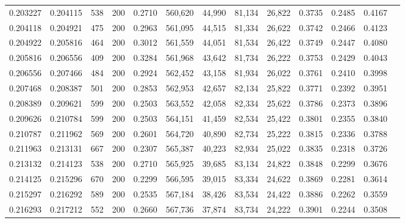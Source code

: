 \begin{tabular}{rrrrrrrrrrrrr}
0.203227 & 0.204115 &    538 & 200 &                                     0.2710 & 560,620 &  44,990 &  81,134 &  26,822 & 0.3735 & 0.2485 & 0.4167 \\
0.204118 & 0.204921 &    475 & 200 &                                     0.2963 & 561,095 &  44,515 &  81,334 &  26,622 & 0.3742 & 0.2466 & 0.4123 \\
0.204922 & 0.205816 &    464 & 200 &                                     0.3012 & 561,559 &  44,051 &  81,534 &  26,422 & 0.3749 & 0.2447 & 0.4080 \\
0.205816 & 0.206556 &    409 & 200 &                                     0.3284 & 561,968 &  43,642 &  81,734 &  26,222 & 0.3753 & 0.2429 & 0.4043 \\
0.206556 & 0.207466 &    484 & 200 &                                     0.2924 & 562,452 &  43,158 &  81,934 &  26,022 & 0.3761 & 0.2410 & 0.3998 \\
0.207468 & 0.208387 &    501 & 200 &                                     0.2853 & 562,953 &  42,657 &  82,134 &  25,822 & 0.3771 & 0.2392 & 0.3951 \\
0.208389 & 0.209621 &    599 & 200 &                                     0.2503 & 563,552 &  42,058 &  82,334 &  25,622 & 0.3786 & 0.2373 & 0.3896 \\
0.209626 & 0.210784 &    599 & 200 &                                     0.2503 & 564,151 &  41,459 &  82,534 &  25,422 & 0.3801 & 0.2355 & 0.3840 \\
0.210787 & 0.211962 &    569 & 200 &                                     0.2601 & 564,720 &  40,890 &  82,734 &  25,222 & 0.3815 & 0.2336 & 0.3788 \\
0.211963 & 0.213131 &    667 & 200 &                                     0.2307 & 565,387 &  40,223 &  82,934 &  25,022 & 0.3835 & 0.2318 & 0.3726 \\
0.213132 & 0.214123 &    538 & 200 &                                     0.2710 & 565,925 &  39,685 &  83,134 &  24,822 & 0.3848 & 0.2299 & 0.3676 \\
0.214125 & 0.215296 &    670 & 200 &                                     0.2299 & 566,595 &  39,015 &  83,334 &  24,622 & 0.3869 & 0.2281 & 0.3614 \\
0.215297 & 0.216292 &    589 & 200 &                                     0.2535 & 567,184 &  38,426 &  83,534 &  24,422 & 0.3886 & 0.2262 & 0.3559 \\
0.216293 & 0.217212 &    552 & 200 &                                     0.2660 & 567,736 &  37,874 &  83,734 &  24,222 & 0.3901 & 0.2244 & 0.3508 \\

\end{tabular}
